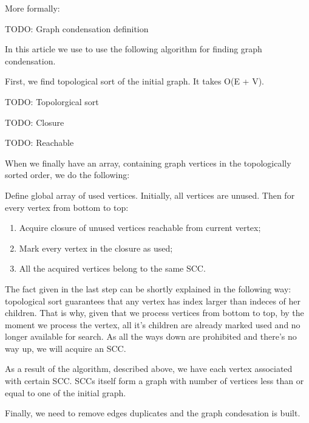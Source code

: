 \documentclass{svproc}
\begin{document}
More formally:\par
\begin{definition}
TODO: Graph condensation definition
\end{definition}

In this article we use to use the following algorithm for finding graph condensation.\par

First, we find topological sort of the initial graph. It takes O(E + V).
\begin{definition}
TODO: Topolorgical sort
\end{definition}

\begin{definition}
TODO: Closure
\end{definition}

\begin{definition}
TODO: Reachable
\end{definition}

When we finally have an array, containing graph vertices in the topologically sorted order, we do the following:

Define global array of used vertices. Initially, all vertices are unused.
Then for every vertex from bottom to top:
\begin{enumerate}
    \item Acquire closure of unused vertices reachable from current vertex; 
    \item Mark every vertex in the closure as used;
    \item All the acquired vertices belong to the same SCC.
\end{enumerate}

The fact given in the last step can be shortly explained in the following way:
topological sort guarantees that any vertex has index larger than indeces of her children.
That is why, given that we process vertices from bottom to top, by the moment we process the vertex, all it's children are already marked used and no longer available for search.
As all the ways down are prohibited and there's no way up, we will acquire an SCC.\par

As a result of the algorithm, described above, we have each vertex associated with certain SCC.
SCCs itself form a graph with number of vertices less than or equal to one of the initial graph.

Finally, we need to remove edges duplicates and the graph condesation is built.
\end{document}
